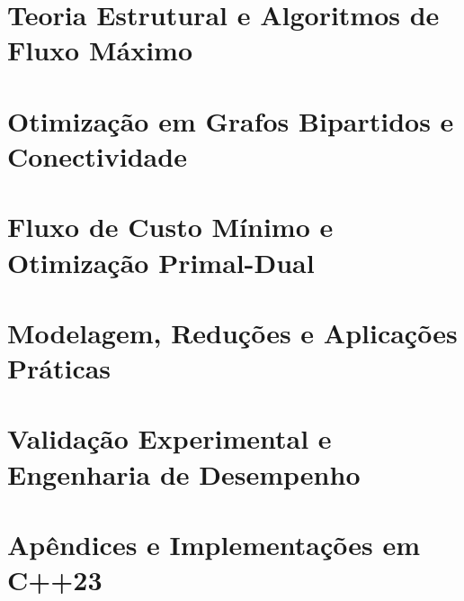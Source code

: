 \documentclass[11pt,a4paper,oneside]{book}
\newcommand{\divisaobloco}[2]{\part{#2}}
\begin{document}
\setlength{\emergencystretch}{3em}



\mainmatter

\divisaobloco{bloco:max_flow}{Teoria Estrutural e Algoritmos de Fluxo Máximo}





\divisaobloco{bloco:estrutural}{Otimização em Grafos Bipartidos e Conectividade}



\divisaobloco{bloco:min_cost}{Fluxo de Custo Mínimo e Otimização Primal-Dual}






\divisaobloco{bloco:aplicacoes}{Modelagem, Reduções e Aplicações Práticas}



\divisaobloco{bloco:benchmarks}{Validação Experimental e Engenharia de Desempenho}




\backmatter




\appendix
\part{Apêndices e Implementações em C++23}




















\end{document}
